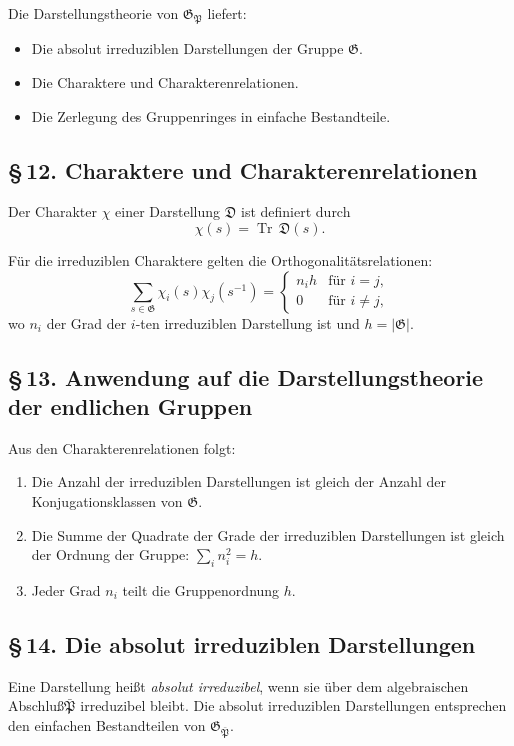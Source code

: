 \documentclass[10pt,a4paper]{article}
\theoremstyle{plain}
\theoremstyle{definition}
\theoremstyle{remark}
\DeclareMathOperator{\Tr}{Tr}
\begin{document}
Die Darstellungstheorie von $\mathfrak{G}_\mathfrak{P}$ liefert:
\begin{itemize}
\item Die absolut irreduziblen Darstellungen der Gruppe $\mathfrak{G}$.
\item Die Charaktere und Charakterenrelationen.
\item Die Zerlegung des Gruppenringes in einfache Bestandteile.
\end{itemize}

\subsection*{\S\,12. Charaktere und Charakterenrelationen}

Der Charakter $\chi$ einer Darstellung $\mathfrak{D}$ ist definiert durch
\[
\chi(s) = \Tr\,\mathfrak{D}(s).
\]

F\"ur die irreduziblen Charaktere gelten die Orthogonalit\"atsrelationen:
\[
\sum_{s \in \mathfrak{G}} \chi_i(s) \chi_j(s^{-1}) =
\begin{cases}
n_i h & \text{f\"ur } i = j,\\
0 & \text{f\"ur } i \neq j,
\end{cases}
\]
wo $n_i$ der Grad der $i$-ten irreduziblen Darstellung ist und $h = |\mathfrak{G}|$.

\subsection*{\S\,13. Anwendung auf die Darstellungstheorie der endlichen Gruppen}

Aus den Charakterenrelationen folgt:
\begin{enumerate}
\item Die Anzahl der irreduziblen Darstellungen ist gleich der Anzahl der Konjugationsklassen von $\mathfrak{G}$.
\item Die Summe der Quadrate der Grade der irreduziblen Darstellungen ist gleich der Ordnung der Gruppe: $\sum_i n_i^2 = h$.
\item Jeder Grad $n_i$ teilt die Gruppenordnung $h$.
\end{enumerate}

\subsection*{\S\,14. Die absolut irreduziblen Darstellungen}

Eine Darstellung hei\ss t \emph{absolut irreduzibel}, wenn sie \"uber dem algebraischen Abschlu\ss  $\bar{\mathfrak{P}}$ irreduzibel bleibt. Die absolut irreduziblen Darstellungen entsprechen den einfachen Bestandteilen von $\mathfrak{G}_{\bar{\mathfrak{P}}}$.
\end{document}

